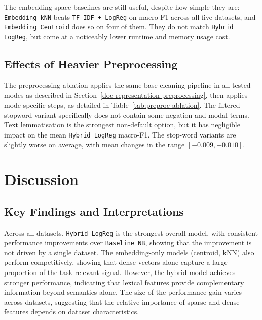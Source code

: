 \documentclass[10pt,a4paper]{article}
\begin{document}
The embedding-space baselines are still useful, despite how simple they are: \texttt{Embedding kNN} beats \texttt{TF-IDF + LogReg} on macro-F1 across all five datasets, and \texttt{Embedding Centroid} does so on four of them. They do not match \texttt{Hybrid LogReg}, but come at a noticeably lower runtime and memory usage cost.



\subsection{Effects of Heavier Preprocessing}

The preprocessing ablation applies the same base cleaning pipeline in all tested modes as described in Section~\ref{doc-representation-preprocessing}, then applies mode-specific steps, as detailed in Table~\ref{tab:preproc-ablation}. The filtered stopword variant specifically does not contain some negation and modal terms.
Text lemmatisation is the strongest non-default option, but it has negligible impact on the mean \texttt{Hybrid LogReg} macro-F1. The stop-word variants are slightly worse on average, with mean changes in the range $[-0.009, -0.010]$.

\begin{table}[h]
\centering
\small
\setlength{\tabcolsep}{6pt}

\caption{Preprocessing variants and hybrid macro-F1 change vs default.}\label{tab:preproc-ablation}
\end{table}


\section{Discussion}\label{discussion}

\subsection{Key Findings and Interpretations}

Across all datasets, \texttt{Hybrid LogReg} is the strongest overall model, with consistent performance improvements over \texttt{Baseline NB}, showing that the improvement is not driven by a single dataset. The embedding-only models (centroid, kNN) also perform competitively, showing that dense vectors alone capture a large proportion of the task-relevant signal. However, the hybrid model achieves stronger performance, indicating that lexical features provide complementary information beyond semantics alone. The size of the performance gain varies across datasets, suggesting that the relative importance of sparse and dense features depends on dataset characteristics.
\end{document}
